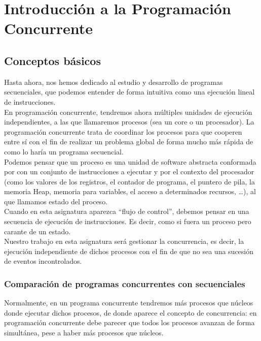 \chapter{Introducción a la Programación Concurrente}
\section{Conceptos básicos}
Hasta ahora, nos hemos dedicado al estudio y desarrollo de programas secuenciales, que podemos entender de forma intuitiva como una ejecución lineal de instrucciones.\\

En programación concurrente, tendremos ahora múltiples unidades de ejecución independientes, a las que llamaremos procesos (sea un core o un procesador). La programación concurrente trata de coordinar los procesos para que cooperen entre sí con el fin de realizar un problema global de forma mucho más rápida de como lo haría un programa secuencial.\\

Podemos pensar que un proceso es una unidad de software abstracta conformada por con un conjunto de instrucciones a ejecutar y por el contexto del procesador (como los valores de los registros, el contador de programa, el puntero de pila, la memoria Heap, memoria para variables, el acceso a determinados recursos, \ldots), al que llamamos estado del proceso.\\

Cuando en esta asignatura aparezca ``flujo de control'', debemos pensar en una secuencia de ejecución de instrucciones. Es decir, como si fuera un proceso pero carante de un estado.\\

Nuestro trabajo en esta asignatura será gestionar la concurrencia, es decir, la ejecución independiente de dichos procesos con el fin de que no sea una sucesión de eventos incontrolados.

\subsection{Comparación de programas concurrentes con secuenciales}
Normalmente, en un programa concurrente tendremos más procesos que núcleos donde ejecutar dichos procesos, de donde aparece el concepto de concurrencia: en programación concurrente debe parecer que todos los procesos avanzan de forma simultánea, pese a haber más procesos que núcleos.\\

